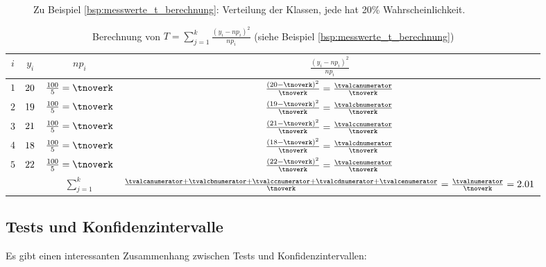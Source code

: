 {\begin{figure}
    \centering
    \begin{tikzpicture}
    \end{tikzpicture}
    \caption{Zu Beispiel \ref{bsp:messwerte_t_berechnung}: Verteilung der Klassen, jede hat 20\% Wahrscheinlichkeit.}
    \label{fig:classes}
\end{figure}

\begin{table}
    \centering
    \begin{tabular}{|c|c|c|c|}
        \hline
        $i$ & $y_i$ & $np_i$ & $\frac{(y_i-np_i)^2}{np_i}$\\
        \hline
        $1$ & $\numca$ & $\frac{\valn}{\valk}=\tnoverk$ & $\frac{(\numca-\tnoverk)^2}{\tnoverk}=\frac{\tvalcanumerator}{\tnoverk}$ \\
        \hline
        $2$ & $\numcb$ & $\frac{\valn}{\valk}=\tnoverk$ & $\frac{(\numcb-\tnoverk)^2}{\tnoverk}=\frac{\tvalcbnumerator}{\tnoverk}$ \\
        \hline
        $3$ & $\numcc$ & $\frac{\valn}{\valk}=\tnoverk$ & $\frac{(\numcc-\tnoverk)^2}{\tnoverk}=\frac{\tvalccnumerator}{\tnoverk}$ \\
        \hline
        $4$ & $\numcd$ & $\frac{\valn}{\valk}=\tnoverk$ & $\frac{(\numcd-\tnoverk)^2}{\tnoverk}=\frac{\tvalcdnumerator}{\tnoverk}$ \\
        \hline
        $5$ & $\numce$ & $\frac{\valn}{\valk}=\tnoverk$ & $\frac{(\numce-\tnoverk)^2}{\tnoverk}=\frac{\tvalcenumerator}{\tnoverk}$ \\
        \hline
        & & $\sum_{j=1}^k$ & $\frac{\tvalcanumerator+\tvalcbnumerator+\tvalccnumerator+\tvalcdnumerator+\tvalcenumerator}{\tnoverk}=\frac{\tvalnumerator}{\tnoverk}=\tval$\\
        \hline
    \end{tabular}
    \caption{Berechnung von $T=\sum_{j=1}^k\frac{(y_i-np_i)^2}{np_i}$ (siehe Beispiel \ref{bsp:messwerte_t_berechnung})}\label{tab:messwerte_t_berechnung}
\end{table}
}

\subsection{Tests und Konfidenzintervalle}
Es gibt einen interessanten Zusammenhang zwischen Tests und Konfidenzintervallen:

